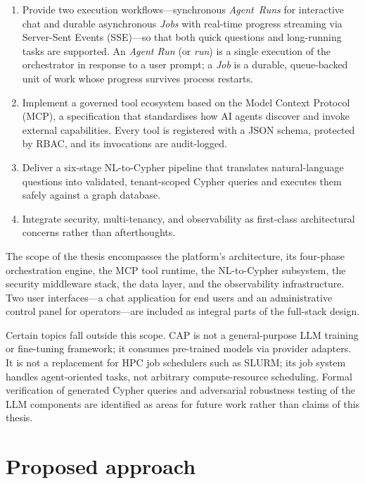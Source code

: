 \documentclass[a4paper]{sapthesis}
\begin{document}
\begin{enumerate}
    \item Provide two execution workflows---synchronous \emph{Agent~Runs}
          for interactive chat and durable asynchronous \emph{Jobs} with
          real-time progress streaming via Server-Sent Events (SSE)---so
          that both quick questions and long-running tasks are supported.
          An \emph{Agent Run} (or \emph{run}) is a single execution of the
          orchestrator in response to a user prompt; a \emph{Job} is a
          durable, queue-backed unit of work whose progress survives
          process restarts.
    \item Implement a governed tool ecosystem based on the Model Context
          Protocol (MCP), a specification that standardises how AI agents
          discover and invoke external capabilities.  Every tool is
          registered with a JSON schema, protected by RBAC, and its
          invocations are audit-logged.
    \item Deliver a six-stage NL-to-Cypher pipeline that translates
          natural-language questions into validated, tenant-scoped Cypher
          queries and executes them safely against a graph database.
    \item Integrate security, multi-tenancy, and observability as first-class
          architectural concerns rather than afterthoughts.
\end{enumerate}

The scope of the thesis encompasses the platform's architecture, its
four-phase orchestration engine, the MCP tool runtime, the NL-to-Cypher
subsystem, the security middleware stack, the data layer, and the
observability infrastructure.  Two user interfaces---a chat application for
end users and an administrative control panel for operators---are included
as integral parts of the full-stack design.

Certain topics fall outside this scope.  CAP is not a general-purpose LLM
training or fine-tuning framework; it consumes pre-trained models via
provider adapters.  It is not a replacement for HPC job schedulers such as
SLURM; its job system handles agent-oriented tasks, not arbitrary
compute-resource scheduling.  Formal verification of generated Cypher
queries and adversarial robustness testing of the LLM components are
identified as areas for future work rather than claims of this thesis.

\section{Proposed approach}
\label{sec:proposed-approach}
\end{document}
